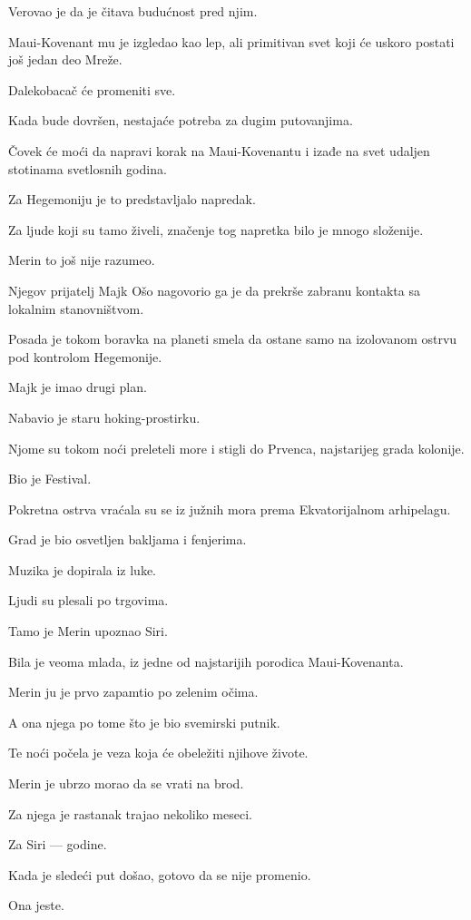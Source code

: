 Verovao je da je čitava budućnost pred njim.

Maui-Kovenant mu je izgledao kao lep, ali primitivan svet koji će uskoro postati još jedan deo Mreže.

Dalekobacač će promeniti sve.

Kada bude dovršen, nestajaće potreba za dugim putovanjima.

Čovek će moći da napravi korak na Maui-Kovenantu i izađe na svet udaljen stotinama svetlosnih godina.

Za Hegemoniju je to predstavljalo napredak.

Za ljude koji su tamo živeli, značenje tog napretka bilo je mnogo složenije.

Merin to još nije razumeo.

\bigskip

Njegov prijatelj Majk Ošo nagovorio ga je da prekrše zabranu kontakta sa lokalnim stanovništvom.

Posada je tokom boravka na planeti smela da ostane samo na izolovanom ostrvu pod kontrolom Hegemonije.

Majk je imao drugi plan.

Nabavio je staru hoking-prostirku.

Njome su tokom noći preleteli more i stigli do Prvenca, najstarijeg grada kolonije.

Bio je Festival.

Pokretna ostrva vraćala su se iz južnih mora prema Ekvatorijalnom arhipelagu.

Grad je bio osvetljen bakljama i fenjerima.

Muzika je dopirala iz luke.

Ljudi su plesali po trgovima.

Tamo je Merin upoznao Siri.

Bila je veoma mlada, iz jedne od najstarijih porodica Maui-Kovenanta.

Merin ju je prvo zapamtio po zelenim očima.

A ona njega po tome što je bio svemirski putnik.

Te noći počela je veza koja će obeležiti njihove živote.

Merin je ubrzo morao da se vrati na brod.

Za njega je rastanak trajao nekoliko meseci.

Za Siri --- godine.

Kada je sledeći put došao, gotovo da se nije promenio.

Ona jeste.

